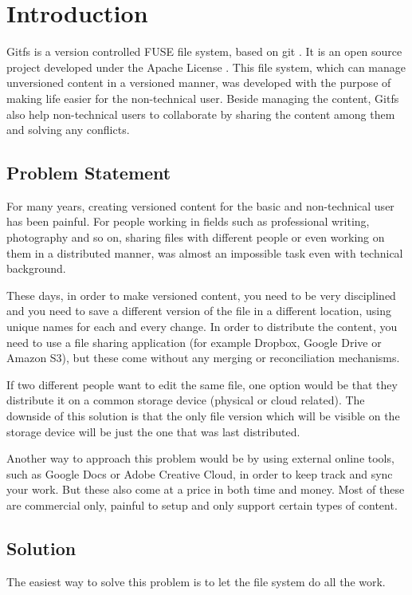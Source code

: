 
\chapter{Introduction}

Gitfs is a version controlled FUSE \cite{Rajgarhia2010} file system, based on git \cite{Spinellis2012}. It is an open source project developed under the Apache License \cite{Sinclair2010}. This file system, which can manage unversioned content in a versioned manner, was developed with the purpose of making life easier for the non-technical user. Beside managing the content, Gitfs also help non-technical users to collaborate by sharing the content among them and solving any conflicts.

\section{Problem Statement}

For many years, creating versioned content for the basic and non-technical user has been painful. For people working in fields such as professional writing, photography and so on, sharing files with different people or even working on them in a distributed manner, was almost an impossible task even with technical background.

These days, in order to make versioned content, you need to be very disciplined and you need to save a different version of the file in a different location, using unique names for each and every change. In order to distribute the content, you need to use a file sharing application (for example Dropbox, Google Drive or Amazon S3), but these come without any merging or reconciliation mechanisms. 

If two different people want to edit the same file, one option would be that they distribute it on a common storage device (physical or cloud related). The downside of this solution is that the only file version which will be visible on the storage device will be just the one that was last distributed.

Another way to approach this problem would be by using external online tools, such as Google Docs or Adobe Creative Cloud, in order to keep track and sync your work. But these also come at a price in both time and money. Most of these are commercial only, painful to setup and only support certain types of content.

\section{Solution}
The easiest way to solve this problem is to let the file system do all the work.

